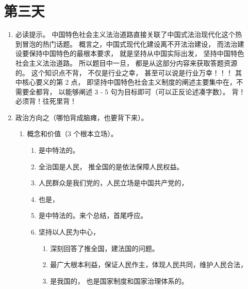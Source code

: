 \section{第三天}
\begin{enumerate}
  \item 必读提示。
        中国特色社会主义法治道路直接关联了中国式法治现代化这个热到冒泡的热门话题。
        概言之，中国式现代化建设离不开法治建设，
        而法治建设要保持中国特色的最根本要求，
        就是坚持从中国实际出发，
        坚持中国特色社会主义法治道路。
        所以题目中一旦，
        都是从这部分内容来获取答题资源的。
        这个知识点不背，
        不仅是行业之幸，
        甚至可以说是行业万幸！！！
        其中核心要义的第 2 点，
        即坚持中国特色社会主义制度的阐述主要集中在，不需要全都背，
        以能够阐述 3 - 5 句为目标即可（可以正反论述凑字数）。
        背！必须背！往死里背！
  \item 政治方向之（哪怕背成脑瘫，也要背下来）。
        \begin{enumerate}
          \item 概念和价值（3 个根本立场）。
                \begin{enumerate}
                  \item 是中特法的。
                  \item 全治国是人民，
                        推全国的是依法保障人民权益。
                  \item 人民群众是我们党的，人民立场是中国共产党的，
                  \item 也是，
                  \item 是中特法的。来个总结，首尾呼应。
                  \item 坚持以人民为中心，
                        \begin{enumerate}
                          \item 深刻回答了推全国，建法国的问题。
                          \item {}最广大根本利益，保证人民作主，体现人民共同，维护人民合法，
                          \item 是我国的，
                                也是国家制度和国家治理体系的。

\end{enumerate}
\end{enumerate}
\end{enumerate}
\end{enumerate}
